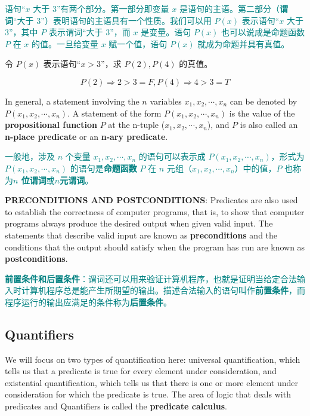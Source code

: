 \documentclass[12pt, a4paper]{article} %
\begin{document}
\textcolor{teal}{
    语句“$x$ 大于 $3$”有两个部分。第一部分即变量 $x$ 是语句的主语。第二部分（\textbf{谓词}“大于 $3$”）表明语句的主语具有一个性质。我们可以用 $P(x)$ 表示语句“$x$ 大于 $3$”，其中 $P$ 表示谓词“大于 $3$”，而 $x$ 是变量。语句 $P(x)$ 也可以说成是命题函数 $P$ 在 $x$ 的值。一旦给变量 $x$ 赋一个值，语句 $P(x)$ 就成为命题并具有真值。
}

\begin{example}
    令 $P(x)$ 表示语句“$x > 3$”，求 $P(2), P(4)$ 的真值。
\end{example}
$$P(2) \Rightarrow 2 > 3 = F, P(4) \Rightarrow 4 > 3 = T$$

In general, a statement involving the $n$ variables $x_1, x_2, \cdots, x_n$ can be denoted by $P(x_1, x_2, \cdots, x_n)$.
A statement of the form $P(x_1, x_2, \cdots, x_n)$ is the value of the \textbf{propositional function} $P$ at the n-tuple ($x_1, x_2, \cdots, x_n$), and $P$ is also called an \textbf{n-place predicate} or an \textbf{n-ary predicate}.

\textcolor{teal}{
    一般地，涉及 $n$ 个变量 $x_1, x_2, \cdots, x_n$ 的语句可以表示成 $P(x_1, x_2, \cdots, x_n)$，形式为 $P(x_1, x_2, \cdots, x_n)$ 的语句是\textbf{命题函数} $P$ 在 $n$ 元组（$x_1, x_2, \cdots, x_n$）中的值，$P$ 也称为\textbf{$n$ 位谓词}或\textbf{$n$元谓词}。
}

\textbf{PRECONDITIONS AND POSTCONDITIONS}: Predicates are also used to establish the correctness of computer programs, that is, to show that computer programs always produce the desired output when given valid input. The statements that describe valid input are known as \textbf{preconditions} and the conditions that the output should satisfy when the program has run are known as \textbf{postconditions}.

\textcolor{teal}{
    \textbf{前置条件和后置条件}：谓词还可以用来验证计算机程序，也就是证明当给定合法输入时计算机程序总是能产生所期望的输出。描述合法输入的语句叫作\textbf{前置条件}，而程序运行的输出应满足的条件称为\textbf{后置条件}。
}

\subsection{Quantifiers}

We will focus on two types of quantification here: universal quantification, which tells us that a predicate is true for every element under consideration, and existential quantification, which tells us that there is one or more element under consideration for which the predicate is true. The area of logic that deals with predicates and Quantifiers is called the \textbf{predicate calculus}.
\end{document}
